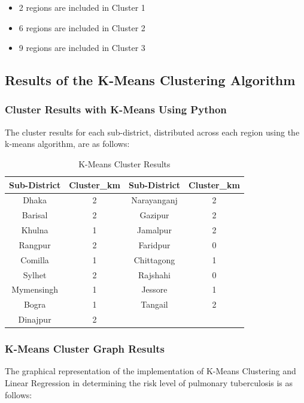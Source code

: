 \documentclass[conference]{IEEEtran}
\begin{document}
    \begin{itemize}
        \item 2 regions are included in Cluster 1
        \item 6 regions are included in Cluster 2
        \item 9 regions are included in Cluster 3
    \end{itemize}

    \subsection{Results of the K-Means Clustering Algorithm}
    \subsubsection{Cluster Results with K-Means Using Python}
    The cluster results for each sub-district, distributed across each region using the k-means algorithm, are as follows:

    \begin{table}[H]
        \centering
        \begin{tabular}{|c|c|c|c|}
        \hline
        \textbf{Sub-District} & \textbf{Cluster\_km} & \textbf{Sub-District} & \textbf{Cluster\_km} \\ \hline
        Dhaka & 2 & Narayanganj & 2 \\ \hline
        Barisal & 2 & Gazipur & 2 \\ \hline
        Khulna & 1 & Jamalpur & 2 \\ \hline
        Rangpur & 2 & Faridpur & 0 \\ \hline
        Comilla & 1 & Chittagong & 1 \\ \hline
        Sylhet & 2 & Rajshahi & 0 \\ \hline
        Mymensingh & 1 & Jessore & 1 \\ \hline
        Bogra & 1 & Tangail & 2 \\ \hline
        Dinajpur & 2 & & \\ \hline
        \end{tabular}    
        \caption{K-Means Cluster Results}
        \label{tab:my_label3}
    \end{table}
    

    \subsubsection{K-Means Cluster Graph Results}
    The graphical representation of the implementation of K-Means Clustering and Linear Regression in determining the risk level of pulmonary tuberculosis is as follows:
\end{document}
